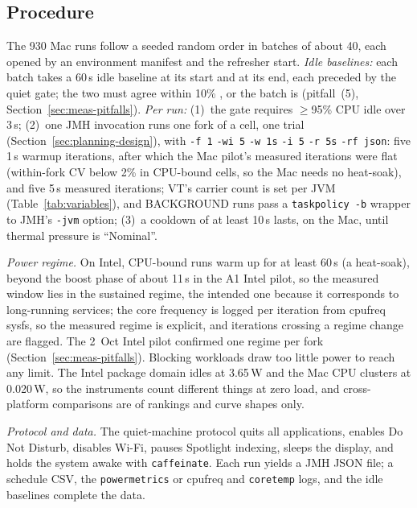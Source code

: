 \subsection{Procedure}\label{sec:meas-procedure}
The 930 Mac runs follow a seeded random order in batches of about 40, each opened by an environment manifest and the refresher start. \emph{Idle baselines:} each batch takes a 60\,s idle baseline at its start and at its end, each preceded by the quiet gate; the two must agree within 10\% , or the batch is  (pitfall~(5), Section~\ref{sec:meas-pitfalls}). \emph{Per run:} (1)~the gate requires $\geq$95\% CPU idle over 3\,s; (2)~one JMH invocation runs one fork of a cell, one trial (Section~\ref{sec:planning-design}), with \mbox{\texttt{-f 1}} \mbox{\texttt{-wi 5}} \mbox{\texttt{-w 1s}} \mbox{\texttt{-i 5}} \mbox{\texttt{-r 5s}} \mbox{\texttt{-rf json}}: five 1\,s warmup iterations, after which the Mac pilot's measured iterations were flat (within-fork CV below 2\% in CPU-bound cells, so the Mac needs no heat-soak), and five 5\,s measured iterations; VT's carrier count is set per JVM (Table~\ref{tab:variables}), and BACKGROUND runs pass a \mbox{\texttt{taskpolicy -b}} wrapper to JMH's \mbox{\texttt{-jvm}} option; (3)~a cooldown of at least 10\,s lasts, on the Mac, until thermal pressure is ``Nominal''.

\emph{Power regime.} On Intel, CPU-bound runs warm up for at least 60\,s (a heat-soak), beyond the boost phase of about 11\,s in the A1 Intel pilot, so the measured window lies in the sustained regime, the intended one because it corresponds to long-running services; the core frequency is logged per iteration from cpufreq sysfs, so the measured regime is explicit, and iterations crossing a regime change are flagged. The 2~Oct Intel pilot confirmed one regime per fork (Section~\ref{sec:meas-pitfalls}). Blocking workloads draw too little power to reach any limit. The Intel package domain idles at 3.65\,W and the Mac CPU clusters at 0.020\,W, so the instruments count different things at zero load, and cross-platform comparisons are of rankings and curve shapes only.

\emph{Protocol and data.} The quiet-machine protocol quits all applications, enables Do Not Disturb, disables Wi-Fi, pauses Spotlight indexing, sleeps the display, and holds the system awake with \texttt{caffeinate}.  Each run yields a JMH JSON file; a schedule CSV, the \texttt{powermetrics} or cpufreq and \texttt{coretemp} logs, and the idle baselines complete the data.

